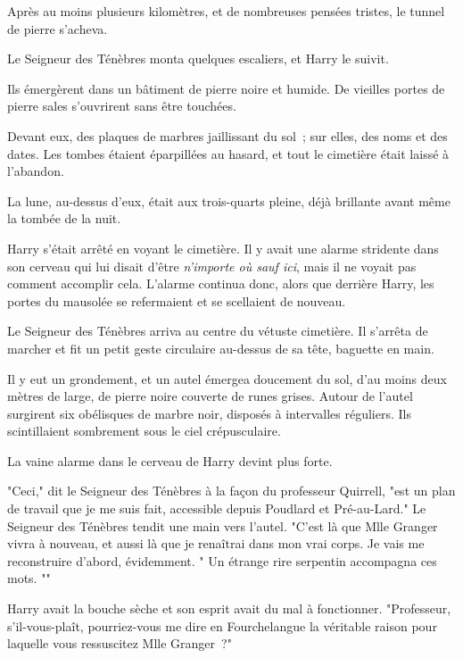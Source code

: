 Après au moins plusieurs kilomètres, et de nombreuses pensées tristes, le tunnel de pierre s'acheva.

Le Seigneur des Ténèbres monta quelques escaliers, et Harry le suivit.

Ils émergèrent dans un bâtiment de pierre noire et humide. De vieilles portes de pierre sales s'ouvrirent sans être touchées.

Devant eux, des plaques de marbres jaillissant du sol~; sur elles, des noms et des dates. Les tombes étaient éparpillées au hasard, et tout le cimetière était laissé à l'abandon.

La lune, au-dessus d'eux, était aux trois-quarts pleine, déjà brillante avant même la tombée de la nuit.

Harry s'était arrêté en voyant le cimetière. Il y avait une alarme stridente dans son cerveau qui lui disait d'être \emph{n'importe où sauf ici}, mais il ne voyait pas comment accomplir cela. L'alarme continua donc, alors que derrière Harry, les portes du mausolée se refermaient et se scellaient de nouveau.

Le Seigneur des Ténèbres arriva au centre du vétuste cimetière. Il s'arrêta de marcher et fit un petit geste circulaire au-dessus de sa tête, baguette en main.

Il y eut un grondement, et un autel émergea doucement du sol, d'au moins deux mètres de large, de pierre noire couverte de runes grises. Autour de l'autel surgirent six obélisques de marbre noir, disposés à intervalles réguliers. Ils scintillaient sombrement sous le ciel crépusculaire.

La vaine alarme dans le cerveau de Harry devint plus forte.

"Ceci," dit le Seigneur des Ténèbres à la façon du professeur Quirrell, "est un plan de travail que je me suis fait, accessible depuis Poudlard et Pré-au-Lard." Le Seigneur des Ténèbres tendit une main vers l'autel. "C'est là que Mlle Granger vivra à nouveau, et aussi là que je renaîtrai dans mon vrai corps. Je vais me reconstruire d'abord, évidemment. " Un étrange rire serpentin accompagna ces mots. ""

Harry avait la bouche sèche et son esprit avait du mal à fonctionner. "Professeur, s'il-vous-plaît, pourriez-vous me dire en Fourchelangue la véritable raison pour laquelle vous ressuscitez Mlle Granger~?"

